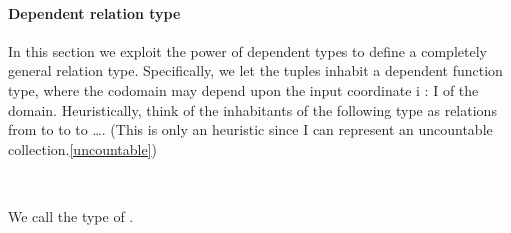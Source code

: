 \paragraph*{Dependent relation type} %
In this section we exploit the power of dependent types to define a completely general relation type. Specifically, we let the tuples inhabit a dependent function type, where the codomain may depend upon the input coordinate \ab i \as : \ab I of the domain. 
Heuristically, think of the inhabitants of the following type as relations from   to   to   to …. (This is only an heuristic since \ab I can represent an uncountable collection.\cref{uncountable})
\ccpad
\begin{code}%
\>[0]\AgdaSpace{}%
\AgdaSymbol{:}\AgdaSpace{}%
\AgdaSymbol{(}\AgdaSpace{}%
\AgdaSymbol{:}\AgdaSpace{}%
\AgdaSpace{}%
\AgdaSymbol{)}\AgdaSpace{}%
\AgdaSpace{}%
\AgdaSymbol{(}\AgdaSpace{}%
\AgdaSpace{}%
\AgdaSpace{}%
\AgdaSymbol{)}\AgdaSpace{}%
\AgdaSpace{}%
\AgdaSymbol{(}\AgdaSpace{}%
\AgdaSymbol{:}\AgdaSpace{}%
\AgdaSymbol{)}\AgdaSpace{}%
\AgdaSpace{}%
\AgdaSpace{}%
\AgdaSpace{}%
\AgdaSpace{}%
\AgdaSpace{}%
\AgdaSpace{}%
\AgdaSpace{}%
\<%
\\
\>[0]\AgdaSpace{}%
\AgdaSpace{}%
\AgdaSpace{}%
\AgdaSpace{}%
\AgdaSymbol{=}\AgdaSpace{}%
\AgdaSpace{}%
\AgdaSpace{}%
\AgdaSpace{}%
\AgdaSpace{}%
\<%
\end{code}
\ccpad
We call  the type of .


